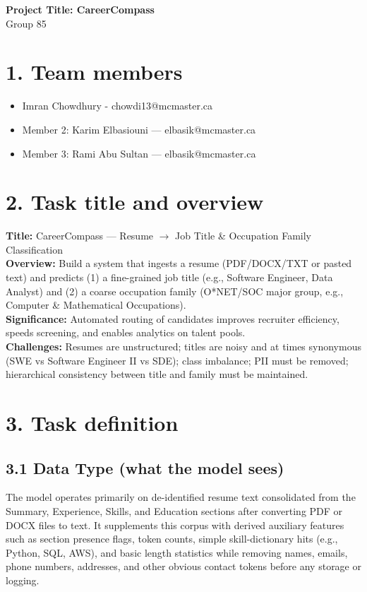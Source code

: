 \documentclass[12pt]{article}
\begin{document}
\begin{center}
  {\Large\bfseries Project Title: CareerCompass}\\[8pt]
  {\normalsize Group 85}
\end{center}

\section*{1. Team members}
\begin{itemize}
  \item Imran Chowdhury - chowdi13@mcmaster.ca
  \item Member 2: Karim Elbasiouni — elbasik@mcmaster.ca
  \item Member 3: Rami Abu Sultan — elbasik@mcmaster.ca
\end{itemize}

\section*{2. Task title and overview}
\textbf{Title:} CareerCompass — Resume $\rightarrow$ Job Title \& Occupation Family Classification\\

\textbf{Overview:} Build a system that ingests a resume (PDF/DOCX/TXT or pasted text) and predicts (1) a fine-grained job title (e.g., Software Engineer, Data Analyst) and (2) a coarse occupation family (O*NET/SOC major group, e.g., Computer \& Mathematical Occupations).\\

\textbf{Significance:} Automated routing of candidates improves recruiter efficiency, speeds screening, and enables analytics on talent pools.  \\

\textbf{Challenges:} Resumes are unstructured; titles are noisy and at times synonymous (SWE vs Software Engineer II vs SDE); class imbalance; PII must be removed; hierarchical consistency between title and family must be maintained.\\

\setlength{\parindent}{0pt}

\section*{3. Task definition}
\subsection*{3.1 Data Type (what the model sees)}
The model operates primarily on de-identified resume text consolidated from the Summary, Experience, Skills, and Education sections after converting PDF or DOCX files to text. It supplements this corpus with derived auxiliary features such as section presence flags, token counts, simple skill-dictionary hits (e.g., Python, SQL, AWS), and basic length statistics while removing names, emails, phone numbers, addresses, and other obvious contact tokens before any storage or logging.
\end{document}
